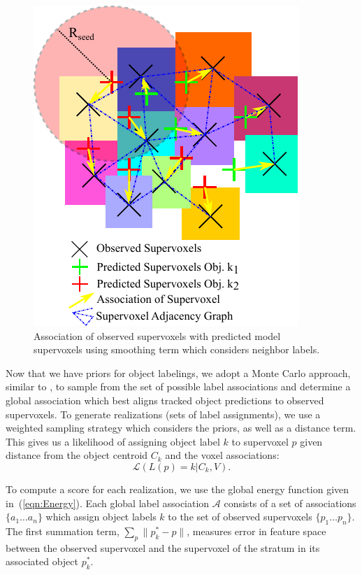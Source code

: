 \begin{figure}[tb]
  \centering
  \includegraphics[scale=1.0]{figures/IROS2013/Association.pdf}
  \caption[Supervoxel Association]{Association of observed supervoxels with predicted model supervoxels using smoothing term which considers neighbor labels.}
  \label{fig:Association}
\end{figure}

Now that we have priors for object labelings, we adopt a Monte Carlo approach, similar to \cite{EnergyBasedMultiModel}, to sample from the set of possible label associations and determine a global association which best aligns tracked object predictions to observed supervoxels. To generate realizations (sets of label assignments), we use a weighted sampling strategy which considers the priors, as well as a distance term. This gives us a likelihood of assigning object label $k$ to supervoxel $p$ given distance from the object centroid $C_k$ and the voxel associations:
\begin{equation}
 \label{eqn:WeightSampling}
 \mathcal{L}(L(p)=k | C_k, V). %
\end{equation}


To compute a score for each realization, we use the global energy function given in~(\ref{eqn:Energy}). Each global label association $\mathcal{A}$ consists of a set of associations $\{a_1 \dots a_n\}$ which assign object labels $k$ to the set of observed supervoxels $\{p_1 \dots p_n\}$. The first summation term, $ \sum_{p}{\|p^*_k - p\|} $, measures error in feature space between the observed supervoxel and the supervoxel of the stratum in its associated object $p^*_k$. 


